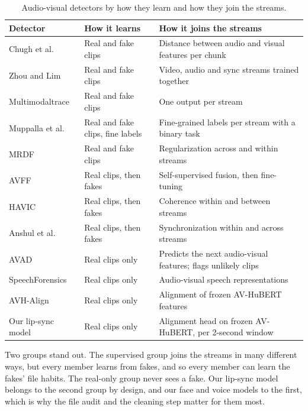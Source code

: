 \begin{table}[ht]
    \centering
    \small
    \caption{Audio-visual detectors by how they learn and how they join the streams.}
    \label{tab:avdetectors}
    \begin{tabularx}{\textwidth}{@{}l >{\raggedright\arraybackslash}X >{\raggedright\arraybackslash}X@{}}
        \toprule
        \textbf{Detector} & \textbf{How it learns} & \textbf{How it joins the streams} \\
        \midrule
        Chugh et al.~\cite{notmade} & Real and fake clips & Distance between audio and visual features per chunk \\
        Zhou and Lim~\cite{zhou2021} & Real and fake clips & Video, audio and sync streams trained together \\
        Multimodaltrace~\cite{multimodaltrace} & Real and fake clips & One output per stream \\
        Muppalla et al.~\cite{muppalla2023} & Real and fake clips, fine labels & Fine-grained labels per stream with a binary task \\
        MRDF~\cite{mrdf} & Real and fake clips & Regularization across and within streams \\
        AVFF~\cite{avff} & Real clips, then fakes & Self-supervised fusion, then fine-tuning \\
        HAVIC~\cite{havic} & Real clips, then fakes & Coherence within and between streams \\
        Anshul et al.~\cite{anshul2025} & Real clips, then fakes & Synchronization within and across streams \\
        AVAD~\cite{avad} & Real clips only & Predicts the next audio-visual features; flags unlikely clips \\
        SpeechForensics~\cite{speechforensics} & Real clips only & Audio-visual speech representations \\
        AVH-Align~\cite{smeu2025} & Real clips only & Alignment of frozen AV-HuBERT features \\
        Our lip-sync model & Real clips only & Alignment head on frozen AV-HuBERT, per 2-second window \\
        \bottomrule
    \end{tabularx}
\end{table}

Two groups stand out. The supervised group joins the streams in many
different ways, but every member learns from fakes, and so every member can
learn the fakes' file habits. The real-only group never sees a fake. Our
lip-sync model belongs to the second group by design, and our face and voice
models to the first, which is why the file audit and the cleaning step matter
for them most.

